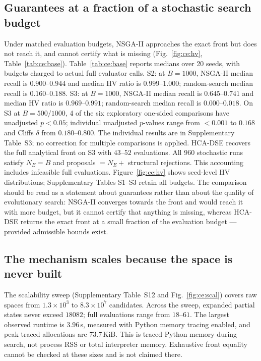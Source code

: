 \documentclass[pdflatex,sn-nature,lineno]{sn-jnl}
\newcommand{\SthreeEvalRange}{43\text{--}52}
\newcommand{\RefBaselinesTab}{Table~\ref{tab:ce:base}}
\newcommand{\RefStatsTab}{Supplementary Table~S3}
\newcommand{\RefHvFig}{Figure~\ref{fig:ce:hv}}
\newcommand{\RefScalSite}{Supplementary Table~S12 and Fig.~\ref{fig:ce:scal}}
\begin{document}
\subsection{Guarantees at a fraction of a stochastic search budget}
Under matched evaluation budgets, NSGA-II approaches the exact front but does not reach
it, and cannot certify what is missing (Fig.~\ref{fig:ce:hv}, Table~\ref{tab:ce:base}).
%
\RefBaselinesTab{} reports medians over 20 seeds, with budgets charged to actual full evaluator calls. S2: at $B=1000$, NSGA-II median recall is $0.900\text{--}0.944$ and median HV ratio is $0.999\text{--}1.000$; random-search median recall is $0.160\text{--}0.188$.
S3: at $B=1000$, NSGA-II median recall is $0.645\text{--}0.741$ and median HV ratio is $0.969\text{--}0.991$; random-search median recall is $0.000\text{--}0.018$.
On S3 at $B=500/1000$, 4 of the six exploratory one-sided comparisons have unadjusted $p<0.05$; individual unadjusted $p$-values range from $<0.001$ to $0.168$ and Cliff\textquotesingle{}s $\delta$ from $0.180\text{--}0.800$. The individual results are in \RefStatsTab{}; no correction for multiple comparisons is applied. HCA-DSE recovers the full analytical front on S3 with $\SthreeEvalRange$ evaluations.
All 960 stochastic runs satisfy $N_E=B$ and proposals $=N_E+$ structural rejections.
This accounting includes infeasible full evaluations. \RefHvFig{} shows
seed-level HV distributions; Supplementary Tables S1--S3 retain all budgets.
The comparison should be read as a statement about guarantees rather than about the
quality of evolutionary search: NSGA-II converges towards the front and would reach it
with more budget, but it cannot certify that anything is missing, whereas HCA-DSE returns
the exact front at a small fraction of the evaluation budget --- provided admissible
bounds exist.

\subsection{The mechanism scales because the space is never built}
%
The scalability sweep (\RefScalSite{}) covers raw spaces from $1.3\times10^3$ to $8.3\times10^7$ candidates. Across the sweep, expanded partial states never exceed $18082$; full evaluations range from $18\text{--}61$. The largest observed runtime is $3.96$\,s, measured with Python memory tracing enabled, and peak traced allocations are $73.7$\,KiB. This is traced Python memory during search, not process RSS or total interpreter memory.
Exhaustive front equality cannot be checked at these sizes and is not claimed there.
\end{document}
